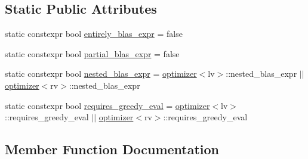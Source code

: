 \subsection*{Static Public Attributes}
\begin{DoxyCompactItemize}
\item 
static constexpr bool \hyperlink{structBC_1_1tensors_1_1exprs_1_1optimizer_3_01Binary__Expression_3_01op_00_01lv_00_01rv_01_4_00_11116ffe640829700a69ab4f1bad216e_ab7c426df227185f57b8fd09053967d01}{entirely\+\_\+blas\+\_\+expr} = false
\item 
static constexpr bool \hyperlink{structBC_1_1tensors_1_1exprs_1_1optimizer_3_01Binary__Expression_3_01op_00_01lv_00_01rv_01_4_00_11116ffe640829700a69ab4f1bad216e_acf871878393bd062043e4cfa42912ae6}{partial\+\_\+blas\+\_\+expr} = false
\item 
static constexpr bool \hyperlink{structBC_1_1tensors_1_1exprs_1_1optimizer_3_01Binary__Expression_3_01op_00_01lv_00_01rv_01_4_00_11116ffe640829700a69ab4f1bad216e_a726a942f8e473b3b470bdcc0c9b6e051}{nested\+\_\+blas\+\_\+expr} = \hyperlink{structBC_1_1tensors_1_1exprs_1_1optimizer}{optimizer}$<$lv$>$\+::nested\+\_\+blas\+\_\+expr $\vert$$\vert$ \hyperlink{structBC_1_1tensors_1_1exprs_1_1optimizer}{optimizer}$<$rv$>$\+::nested\+\_\+blas\+\_\+expr
\item 
static constexpr bool \hyperlink{structBC_1_1tensors_1_1exprs_1_1optimizer_3_01Binary__Expression_3_01op_00_01lv_00_01rv_01_4_00_11116ffe640829700a69ab4f1bad216e_a3c21596759ff6ff4bc495640273981f4}{requires\+\_\+greedy\+\_\+eval} = \hyperlink{structBC_1_1tensors_1_1exprs_1_1optimizer}{optimizer}$<$lv$>$\+::requires\+\_\+greedy\+\_\+eval $\vert$$\vert$ \hyperlink{structBC_1_1tensors_1_1exprs_1_1optimizer}{optimizer}$<$rv$>$\+::requires\+\_\+greedy\+\_\+eval
\end{DoxyCompactItemize}


\subsection{Member Function Documentation}
